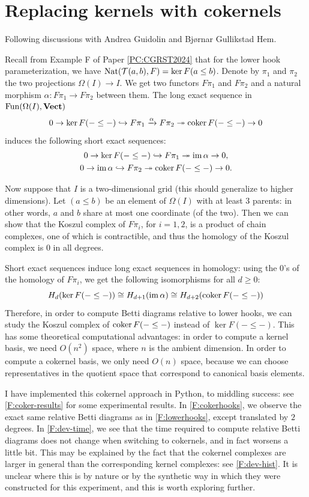 \section{Replacing kernels with cokernels}

Following discussions with Andrea Guidolin and Bjørnar Gullikstad Hem.

Recall from Example F of Paper \ref{PC:CGRST2024} that for the lower hook parameterization, we have $\operatorname{Nat}(\mathcal{T}(a, b), F) = \ker F(a \leq b)$. Denote by $\pi_1$ and $\pi_2$ the two projections $\Omega(I) \to I$. We get two functors $F \pi_1$ and $F \pi_2$ and a natural morphism $\alpha \colon F \pi_1 \to F \pi_2$ between them. The long exact sequence in $\operatorname{Fun}(\Omega(I), \operatorname{\mathbf{Vect}})$
\[
  0 \to \ker F(- \leq -) \hookrightarrow F \pi_1 \xrightarrow{\alpha} F \pi_2 \twoheadrightarrow \operatorname{coker} F(- \leq -) \to 0
\]
induces the following short exact sequences:
\begin{gather*}
  0 \to \ker F(- \leq -) \hookrightarrow F \pi_1 \twoheadrightarrow \operatorname{im} \alpha \to 0, \\
  0 \to \operatorname{im} \alpha \hookrightarrow F \pi_2 \twoheadrightarrow \operatorname{coker} F(- \leq -) \to 0.
\end{gather*}

Now suppose that $I$ is a two-dimensional grid (this should generalize to higher dimensions). Let $(a \leq b)$ be an element of $\Omega(I)$ with at least $3$ parents: in other words, $a$ and $b$ share at most one coordinate (of the two). Then we can show that the Koszul complex of $F \pi_i$, for $i = 1, 2$, is a product of chain complexes, one of which is contractible, and thus the homology of the Koszul complex is $0$ in all degrees.

Short exact sequences induce long exact sequences in homology: using the $0$'s of the homology of $F \pi_i$, we get the following isomorphisms for all $d \geq 0$:
\[
  H_d(\ker F(- \leq -)) \cong H_{d + 1}(\operatorname{im} \alpha) \cong H_{d + 2}(\operatorname{coker} F(- \leq -))
\]
Therefore, in order to compute Betti diagrams relative to lower hooks, we can study the Koszul complex of $\operatorname{coker} F(- \leq -)$ instead of $\ker F(- \leq -)$. This has some theoretical computational advantages: in order to compute a kernel basis, we need $O(n^2)$ space, where $n$ is the ambient dimension. In order to compute a cokernel basis, we only need $O(n)$ space, because we can choose representatives in the quotient space that correspond to canonical basis elements.

I have implemented this cokernel approach in Python, to middling success: see \cref{F:coker-results} for some experimental results. In \cref{F:cokerhooks}, we observe the exact same relative Betti diagrams as in \cref{F:lowerhooks}, except translated by $2$ degrees. In \cref{F:dev-time}, we see that the time required to compute relative Betti diagrams does not change when switching to cokernels, and in fact worsens a little bit. This may be explained by the fact that the cokernel complexes are larger in general than the corresponding kernel complexes: see \cref{F:dev-hist}. It is unclear where this is by nature or by the synthetic way in which they were constructed for this experiment, and this is worth exploring further.

